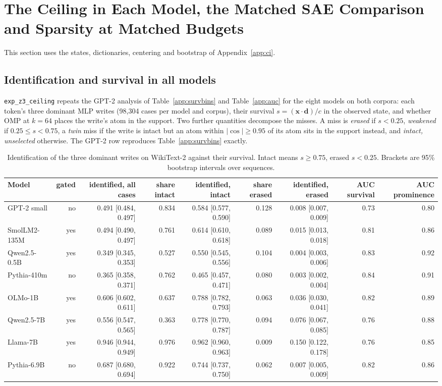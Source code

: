 \section{The Ceiling in Each Model, the Matched SAE Comparison and Sparsity at Matched Budgets}\label{app:z}
This section uses the states, dictionaries, centering and bootstrap of Appendix~\ref{app:ci}.
\subsection{Identification and survival in all models}\label{app:z3}
\texttt{exp\_z3\_ceiling} repeats the GPT-2 analysis of Table~\ref{app:survbins} and Table~\ref{app:auc} for the eight models on both corpora: each token's three dominant MLP writes (98,304 cases per model and corpus), their survival $s=(\mathbf{x}\cdot\mathbf{d})/c$ in the observed state, and whether OMP at $k=64$ places the write's atom in the support. Two further quantities decompose the misses. A miss is \emph{erased} if $s<0.25$, \emph{weakened} if $0.25\le s<0.75$, a \emph{twin} miss if the write is intact but an atom within $|\cos|\ge0.95$ of its atom sits in the support instead, and \emph{intact, unselected} otherwise. The GPT-2 row reproduces Table~\ref{app:survbins} exactly.
\begin{table}[H]\centering\scriptsize
\caption{Identification of the three dominant writes on WikiText-2 against their survival. Intact means $s\ge0.75$, erased $s<0.25$. Brackets are 95\% bootstrap intervals over sequences.}\label{app:z3-surv-wikitext}
\begin{adjustbox}{max width=\linewidth}
\begin{tabular}{lrrrrrrrr}\toprule
Model & gated & identified, all cases & share intact & identified, intact & share erased & identified, erased & AUC survival & AUC prominence \\ \midrule
GPT-2 small & no & 0.491 [0.484, 0.497] & 0.834 & 0.584 [0.577, 0.590] & 0.128 & 0.008 [0.007, 0.009] & 0.73 & 0.80 \\
SmolLM2-135M & yes & 0.494 [0.490, 0.497] & 0.761 & 0.614 [0.610, 0.618] & 0.089 & 0.015 [0.013, 0.018] & 0.81 & 0.86 \\
Qwen2.5-0.5B & yes & 0.349 [0.345, 0.353] & 0.527 & 0.550 [0.545, 0.556] & 0.104 & 0.004 [0.003, 0.006] & 0.83 & 0.92 \\
Pythia-410m & no & 0.365 [0.358, 0.371] & 0.762 & 0.465 [0.457, 0.471] & 0.080 & 0.003 [0.002, 0.004] & 0.84 & 0.91 \\
OLMo-1B & yes & 0.606 [0.602, 0.611] & 0.637 & 0.788 [0.782, 0.793] & 0.063 & 0.036 [0.030, 0.041] & 0.82 & 0.89 \\
Qwen2.5-7B & yes & 0.556 [0.547, 0.565] & 0.363 & 0.778 [0.770, 0.787] & 0.094 & 0.076 [0.067, 0.085] & 0.76 & 0.88 \\
Llama-7B & yes & 0.946 [0.944, 0.949] & 0.976 & 0.962 [0.960, 0.963] & 0.009 & 0.150 [0.122, 0.178] & 0.76 & 0.85 \\
Pythia-6.9B & no & 0.687 [0.680, 0.694] & 0.922 & 0.744 [0.737, 0.750] & 0.062 & 0.007 [0.005, 0.009] & 0.82 & 0.86 \\
\bottomrule\end{tabular}\end{adjustbox}
\end{table}
